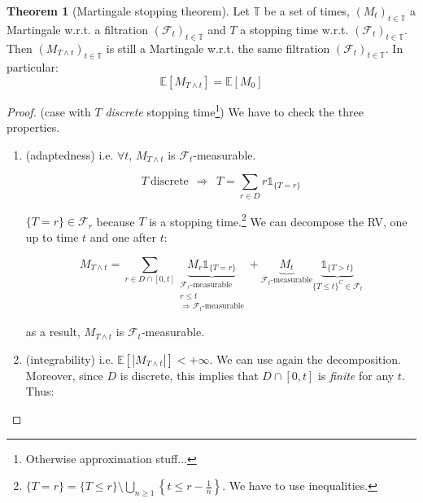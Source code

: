 \documentclass[10pt,a4paper]{article}
\theoremstyle{definition}
\newtheorem{teo}{Theorem}[section]
\newcommand{\ind}{\mathds{1}}
\begin{document}
\begin{teo}
	[Martingale stopping theorem] Let $\mathbb{T}$ be a set of times, $( M_{t})_{t\in \mathbb{T}}$ a Martingale w.r.t. a filtration $(\mathcal{F}_{t})_{t\in \mathbb{T}}$ and $T$ a stopping time w.r.t. $(\mathcal{F}_{t})_{t\in \mathbb{T}}$. Then $( M_{T\land t})_{t\in \mathbb{T}}$ is still a Martingale w.r.t. the same filtration $(\mathcal{F}_{t})_{t\in \mathbb{T}}$. In particular:
	\begin{equation*}
		\mathbb{E}[ M_{T\land t}] =\mathbb{E}[ M_{0}]
	\end{equation*}
\end{teo}
\begin{proof}
	(case with $T$ \textit{discrete} stopping time\footnote{Otherwise approximation stuff...}) We have to check the three properties.
	\begin{enumerate}
		\item (adaptedness) i.e. $\forall t$, $M_{T\land t}$ is $\mathcal{F}_{t}$-measurable.
		      
		      \begin{equation*}
		      	T\ \text{discrete} \ \ \Rightarrow \ \ T=\sum\limits _{r\in D} r\ind_{\{T = r\}}
		      \end{equation*}
		      
		      $\{T=r\} \in \mathcal{F}_{r}$ because $T$ is a stopping time.\footnote{$\{T=r\} =\{T\leqslant r\} \setminus \bigcup _{n\geqslant 1}\left\{t\leqslant r-\frac{1}{n}\right\}$. We have to use inequalities.} We can decompose the RV, one up to time $t$ and one after $t$:
		      
		      \begin{equation*}
		      	M_{T\land t} =\sum _{r\in D\cap [ 0,t]}\underbrace{M_{r}\ind_{\{T=r\}}}_{ \begin{array}{l}
		      		\mathcal{F}_{r}\text{-measurable}\\
		      		r\leq t\\
		      		\Rightarrow \mathcal{F}_{t}\text{-measurable}
		      		\end{array}} +\underbrace{M_{t}}_{\mathcal{F}_{t}\text{-measurable}}\underbrace{\ind_{\{T >t\}}}_{\{T\leq t\}^{C} \in \mathcal{F}_{t}}
		      \end{equation*}
		      
		      as a result, $M_{T\land t}$ is $\mathcal{F}_{t}$-measurable.
		\item (integrability) i.e. $\mathbb{E}[| M_{T\land t}| ] < +\infty $. We can use again the decomposition. Moreover, since $D$ is discrete, this implies that $D\cap [ 0,t]$ is \textit{finite} for any $t$. Thus:
		      

\end{enumerate}
\end{proof}
\end{document}
